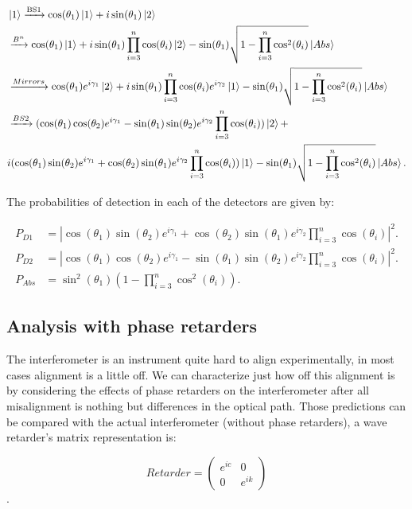 \documentclass[12pt]{article}
\begin{document}
\begin{align*}
&\ket{1}\xrightarrow{\text{BS1}}\cos(\theta_{1})\ket{1}+i\sin(\theta_{1})\ket{2}\\ &\xrightarrow{{B^{n}}}\cos(\theta_{1})\ket{1}+i\sin(\theta_{1})\prod_{i=3}^{n} \cos(\theta_{i})\ket{2}-\sin(\theta_{1})\sqrt{1-\prod_{i=3}^{n}\cos^2(\theta_{i})}\ket{Abs} \\ & \xrightarrow{{Mirrors}}\cos(\theta_{1})  e^{i \gamma_{1}}\ket{2}+i\sin(\theta_{1})\prod_{i=3}^{n} \cos(\theta_{i}) e^{i \gamma_{2}}\ket{1}-\sin(\theta_{1})\sqrt{1-\prod_{i=3}^{n}\cos^2(\theta_{i})}\ket{Abs} \\ & \xrightarrow{{BS2}}(\cos(\theta_{1})\cos(\theta_{2})e^{i \gamma_{1}}-\sin(\theta_{1})\sin(\theta_{2})e^{i \gamma_{2}}\prod_{i=3}^{n} \cos(\theta_{i}))\ket{2}+\\ & i(\cos(\theta_{1})\sin(\theta_{2})e^{i \gamma_{1}}+\cos(\theta_{2})\sin(\theta_{1})e^{i \gamma_{2}}\prod_{i=3}^{n} \cos(\theta_{i}))\ket{1}-\sin(\theta_{1})\sqrt{1-\prod_{i=3}^{n}\cos^2(\theta_{i})}\ket{Abs}.
\end{align*}
 
The probabilities of detection in each of the detectors are given by:

\begin{align}
P_{D1}&=|\cos(\theta_{1})\sin(\theta_{2})e^{i \gamma_{1}}+\cos(\theta_{2})\sin(\theta_{1})e^{i \gamma_{2}}\prod_{i=3}^{n} \cos(\theta_{i})|^2.\\
P_{D2}&=|\cos(\theta_{1})\cos(\theta_{2})e^{i \gamma_{1}}-\sin(\theta_{1})\sin(\theta_{2})e^{i \gamma_{2}}\prod_{i=3}^{n} \cos(\theta_{i})|^2.\\
P_{Abs}&=\sin^2(\theta_{1})\left(1-\prod_{i=3}^{n}\cos^2(\theta_{i})\right).
\end{align}

\subsection{Analysis with phase retarders }

The interferometer is an instrument quite hard to align experimentally, in most cases alignment is a little off. We can characterize just how off this alignment is by considering the effects of phase retarders on the interferometer after all misalignment is nothing but differences in the optical path. Those predictions can be compared with the actual interferometer (without phase retarders), a wave retarder's  matrix representation is:


\begin{equation}
 Retarder=\begin
{pmatrix} e^
{i c} & 0\\0& e^
{i k }\end
{pmatrix}
\end{equation}.
\end{document}
